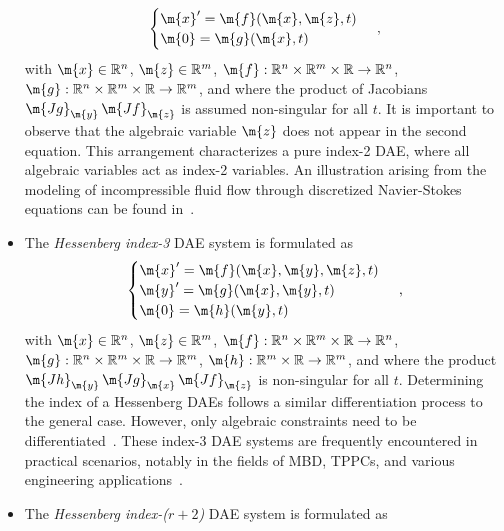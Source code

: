 \begin{itemize}
\begin{equation*}
    \begin{cases}
      \m{x}^{\prime} = \m{f}(\m{x}, \m{z}, t) \\
      \m{0} = \m{g}(\m{x}, t)
    \end{cases} \, \text{,}
  \end{equation*}
  with $\m{x} \in \mathbb{R}^n$, $\m{z} \in \mathbb{R}^m$, $\m{f}: \mathbb{R}^{n} \times \mathbb{R}^{m} \times \mathbb{R} \rightarrow \mathbb{R}^{n}$, $\m{g}: \mathbb{R}^{n} \times \mathbb{R}^{m} \times \mathbb{R} \rightarrow \mathbb{R}^{m}$, and where the product of Jacobians $\m{Jg}_\m{y} \, \m{Jf}_\m{z}$ is assumed non-singular for all $t$. It is important to observe that the algebraic variable $\m{z}$ does not appear in the second equation. This arrangement characterizes a pure index-2 \ac{DAE}, where all algebraic variables act as index-2 variables. An illustration arising from the modeling of incompressible fluid flow through discretized Navier-Stokes equations can be found in~\cite{ascher1998computer}.
  \item The \emph{Hessenberg index-3} \ac{DAE} system is formulated as
  \begin{equation*}
    \begin{cases}
      \m{x}^\prime = \m{f}(\m{x}, \m{y}, \m{z}, t) \\
      \m{y}^\prime = \m{g}(\m{x}, \m{y}, t) \\
      \m{0}        = \m{h}(\m{y}, t)
    \end{cases} \, \text{,}
  \end{equation*}
  with $\m{x} \in \mathbb{R}^n$, $\m{z} \in \mathbb{R}^m$, $\m{f}: \mathbb{R}^{n} \times \mathbb{R}^{m} \times \mathbb{R} \rightarrow \mathbb{R}^{n}$, $\m{g}: \mathbb{R}^{n} \times \mathbb{R}^{m} \times \mathbb{R} \rightarrow \mathbb{R}^{m}$, $\m{h}: \mathbb{R}^{m} \times \mathbb{R} \rightarrow \mathbb{R}^{m}$, and where the product $\m{Jh}_{\m{y}} \, \m{Jg}_{\m{x}} \, \m{Jf}_{\m{z}}$ is non-singular for all $t$. Determining the index of a Hessenberg \acp{DAE} follows a similar differentiation process to the general case. However, only algebraic constraints need to be differentiated~\cite{ascher1991projected}. These index-3 \ac{DAE} systems are frequently encountered in practical scenarios, notably in the fields of \ac{MBD}, \acp{TPPC}, and various engineering applications~\cite{ascher1998computer,brenan1995numerical}.
  \item The \emph{Hessenberg index-($r+2$)} \ac{DAE} system is formulated as
  \begin{equation*}

\end{equation*}
\end{itemize}
